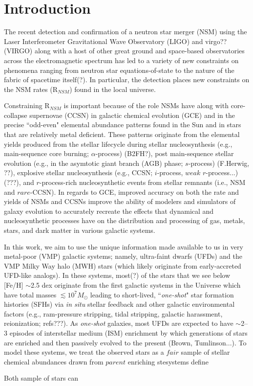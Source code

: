 \section{Introduction}
\label{intro} 
The recent detection and confirmation of a neutron star merger (NSM) using the Laser Interferometer Gravitational Wave Observatory (LIGO) and virgo?? (VIRGO) along with a host of other great ground and space-based observatories across the electromagnetic spectrum has led to a variety of new constraints on phenomena ranging from neutron star equations-of-state to the nature of the fabric of spacetime itself(?). In particular, the detection places new constraints on the NSM rates (R$_{NSM}$) found in the local universe. 

Constraining R$_{NSM}$ is important because of the role NSMs have along with core-collapse supernovae (CCSN) in galactic chemical evolution (GCE) and in the precise ``odd-even" elemental abundance patterns found in the Sun and in stars that are relatively metal deficient. These patterns originate from the elemental yields produced from the stellar lifecycle during stellar nucleosynthesis (e.g., main-sequence core burning; $\alpha$-process) (B2FH?), post main-sequence stellar evolution (e.g., in the asymtotic giant branch (AGB) phase; $s$-process) (F.Herwig, ??), explosive stellar nucleosynthesis (e.g., CCSN; $i$-process, $weak$ $r$-process...) (???), and $r$-process-rich nucleosynthetic events from stellar remnants (i.e., NSM and $rare$-CCSN). In regards to GCE, improved accuracy on both the rate and yields of NSMs and CCSNs improve the ability of modelers and simulators of galaxy evolution to accurately recreate the effects that dynamical and nucleosynthetic processes have on the distribution and processing of gas, metals, stars, and dark matter in various galactic systems.

In this work, we aim to use the unique information made available to us in very metal-poor (VMP) galactic systems; namely, ultra-faint dwarfs (UFDs) and the VMP Milky Way halo (MWH) stars (which likely originate from early-accreted UFD-like analogs). In these systems, most(?) of the stars that we see below [Fe/H] $\sim$2.5 dex originate from the first galactic systems in the Universe which have total masses $\lesssim10^7 M_\odot$ leading to short-lived, ``{\it one-shot}" star formation histories (SFHs) via {\it in situ} stellar feedback and other galactic environmental factors (e.g., ram-pressure stripping, tidal stripping, galactic harassment, reionization; refs???). As {\it one-shot} galaxies, most UFDs are expected to have $\sim$2--3 episodes of interstellar medium (ISM) enrichment by which generations of stars are enriched and then passively evolved to the present (Brown, Tumlinson...). To model these systems, we treat the observed stars as a $fair$ sample of stellar chemical abundances drawn from $parent$ enriching stesystems define  

Both sample of stars can 